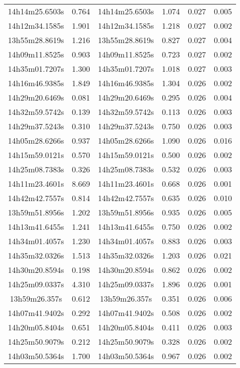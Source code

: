 \begin{table}
\begin{tabular}{cccccc}
14h14m25.6503s & 0.764 & 14h14m25.6503s & 1.074 & 0.027 & 0.005 \\
14h12m34.1585s & 1.901 & 14h12m34.1585s & 1.218 & 0.027 & 0.002 \\
13h55m28.8619s & 1.216 & 13h55m28.8619s & 0.827 & 0.027 & 0.004 \\
14h09m11.8525s & 0.903 & 14h09m11.8525s & 0.723 & 0.027 & 0.002 \\
14h35m01.7207s & 1.300 & 14h35m01.7207s & 1.018 & 0.027 & 0.003 \\
14h16m46.9385s & 1.849 & 14h16m46.9385s & 1.304 & 0.026 & 0.002 \\
14h29m20.6469s & 0.081 & 14h29m20.6469s & 0.295 & 0.026 & 0.004 \\
14h32m59.5742s & 0.139 & 14h32m59.5742s & 0.113 & 0.026 & 0.003 \\
14h29m37.5243s & 0.310 & 14h29m37.5243s & 0.750 & 0.026 & 0.003 \\
14h05m28.6266s & 0.937 & 14h05m28.6266s & 1.090 & 0.026 & 0.016 \\
14h15m59.0121s & 0.570 & 14h15m59.0121s & 0.500 & 0.026 & 0.002 \\
14h25m08.7383s & 0.326 & 14h25m08.7383s & 0.532 & 0.026 & 0.003 \\
14h11m23.4601s & 8.669 & 14h11m23.4601s & 0.668 & 0.026 & 0.001 \\
14h42m42.7557s & 0.814 & 14h42m42.7557s & 0.635 & 0.026 & 0.010 \\
13h59m51.8956s & 1.202 & 13h59m51.8956s & 0.935 & 0.026 & 0.005 \\
14h13m41.6455s & 1.241 & 14h13m41.6455s & 0.750 & 0.026 & 0.002 \\
14h34m01.4057s & 1.230 & 14h34m01.4057s & 0.883 & 0.026 & 0.003 \\
14h35m32.0326s & 1.513 & 14h35m32.0326s & 1.203 & 0.026 & 0.021 \\
14h30m20.8594s & 0.198 & 14h30m20.8594s & 0.862 & 0.026 & 0.002 \\
14h25m09.0337s & 4.310 & 14h25m09.0337s & 1.896 & 0.026 & 0.001 \\
13h59m26.357s & 0.612 & 13h59m26.357s & 0.351 & 0.026 & 0.006 \\
14h07m41.9402s & 0.292 & 14h07m41.9402s & 0.508 & 0.026 & 0.002 \\
14h20m05.8404s & 0.651 & 14h20m05.8404s & 0.411 & 0.026 & 0.003 \\
14h25m50.9079s & 0.212 & 14h25m50.9079s & 0.328 & 0.026 & 0.002 \\
14h03m50.5364s & 1.700 & 14h03m50.5364s & 0.967 & 0.026 & 0.002 \\

\end{tabular}
\end{table}
